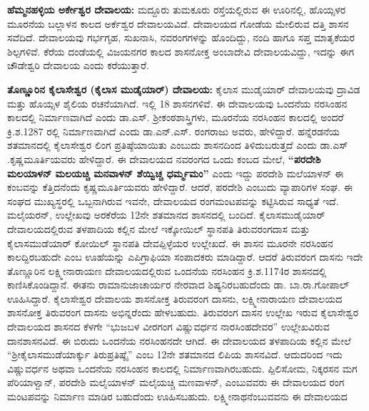 \textbf{ಹೆಮ್ಮನಹಳ್ಳಿಯ ಅರ್ಕೇಶ್ವರ ದೇವಾಲಯ:} ಮದ್ದೂರು ತುಮಕೂರು ರಸ್ತೆಯಲ್ಲಿರುವ ಈ ಊರಿನಲ್ಲಿ, ಹೊಯ್ಸಳರ ಮೂರನೆಯ ಬಲ್ಲಾಳನ ಕಾಲದ ಅರ್ಕೆಶ್ವರ ದೇವಾಲಯವಿದೆ. ದೇವಾಲಯದ ಗೋಡೆಯ ಮೇಲಿರುವ ದತ್ತಿ ಶಾಸನ ಸವೆದಿದೆ. ದೇವಾಲಯವು ಗರ್ಭಗೃಹ, ಸುಖನಾಸಿ, ನವರಂಗಗಳನ್ನು ಹೊಂದಿದ್ದು, ನಂದಿ ಹಾಗೂ ಸಪ್ತ ಮಾತೃಕೆಯರ ಶಿಲ್ಪಗಳಿವೆ. ಕೆರೆಯ ದಂಡೆಯಲ್ಲಿ ವಿಜಯನಗರ ಕಾಲದ ಶಾಸನೋಕ್ತ ಅಂಬಾದೇವಿ ದೇವಾಲಯವಿದ್ದು, ಇದನ್ನು ಈಗ ಚೌಡೇಶ್ವರಿ ದೇವಾಲಯ ಎಂದು ಕರೆಯುತ್ತಾರೆ.

\textbf{ತೊಣ್ಣೂರಿನ ಕೈಲಾಸೇಶ್ವರ (ಕೈಲಾಸ ಮುಡೈಯಾರ್​) ದೇವಾಲಯ:} ಕೈಲಾಸ ಮುಡೈಯಾರ್​ ದೇವಾಲಯವು ದ್ರಾವಿಡ ಮತ್ತು ಹೊಯ್ಸಳ ಶೈಲಿಯ ರಚನೆಯಾಗಿದೆ. ಇಲ್ಲಿ 18 ಶಾಸನಗಳಿವೆ. ಈ ದೇವಾಲಯವು ಒಂದನೆಯ ನರಸಿಂಹನ ಕಾಲದಲ್ಲಿ ನಿರ್ಮಾಣವಾಗಿದೆ ಎಂದು ಡಾ.ಎಸ್​. ಶ‍್ರೀಕಂಠಶಾಸ್ತ್ರಿಗಳು, ಮೂರನೆಯ ನರಸಿಂಹನ ಕಾಲದಲ್ಲಿ ಅಂದರೆ ಕ್ರಿ.ಶ.1287 ರಲ್ಲಿ ನಿರ್ಮಾಣವಾಗಿದೆ ಎಂದು ಡಾ.ಎನ್​.ಎಸ್​. ರಂಗರಾಜು ಅವರು, ಹೇಳಿದ್ದಾರೆ. ಹನ್ನೆರಡನೆಯ ಶತಮಾನದಲ್ಲಿ ಕೈಲಾಸೇಶ್ವರ ಲಿಂಗ ಪ್ರತಿಷ್ಠೆಯಾಯಿತು ಎಂಬುದು ಶಾಸನದಿಂದ ತಿಳಿದುಬರುತ್ತದೆ ಎಂದು ಡಾ.ಎಸ್​.ಕೃಷ್ಣಮೂರ್ತಿಯವರು ಹೇಳಿದ್ದಾರೆ. ಈ ದೇವಾಲಯದ ನವರಂಗದ ಒಂದು ಕಂಬದ ಮೇಲೆ, \textbf{“ಪರದೇಶಿ ಮಲಯಾಳನ್​ ಮಲಯಚ್ಚಿ ಮನವಾಳನ್​ ಶೆಯ್ವಿಚ್ಚ ಧರ್ಮ್ಮಮಂ”} ಎಂದು ಇದ್ದು ಪರದೇಶಿ ಮಲೆಯಾಳನ್​ ಈ ಕಂಬವನ್ನು ಕೆತ್ತಿದನೆಂದು ಕೃಷ್ಣಮೂರ್ತಿಯವರು ಹೇಳಿದ್ದಾರೆ. ಆದರೆ, ಪರದೇಶಿ ಎಂಬುದು ವ್ಯಾಪಾರಿಗಳ ಸಂಘ. ಈ ಸಂಘದ ಮುಖ್ಯಸ್ಥರಲ್ಲಿ ಒಬ್ಬನಾಗಿರುವ ಇವನೇ, ದೇವಾಲಯದ ರಂಗಮಂಟಪವನ್ನು ಕಟ್ಟಿಸಿರುವ ಸಾಧ್ಯತೆ ಇದೆ. ಮಲೈಯರನ್​, ಉಲ್ಲೇಖವು ಅರಕೆರೆಯ 12ನೇ ಶತಮಾನದ ಶಾಸನದಲ್ಲಿ ಬಂದಿದೆ. ಕೈಲಾಸಮುಡೈಯಾರ್​ ದೇವಾಲಯದಲ್ಲಿರುವ ತಳಪಾದಿಯ ಕಲ್ಲಿನ ಮೇಲೆ ಇಕ್ಕೋಯಿಲ್​ ಸ್ಥಾನಪತಿ ತಿರುವರಂಗದಾಸ ಮತ್ತು ಕೈಲಾಸಮುಡೆಯಾರ್​ ಕೋಯಿಲ್​ ಸ್ಥಾನಪತಿ ದೇವಪ್ಪಿಳ್ಳೆಯರ ಉಲ್ಲೇಖದೆ. ಈ ಶಾಸನ ಮೂರನೇ ನರಸಿಂಹನ ಕಾಲದ್ದಿರಬಹುದೇ ಎಂಬ ಊಹೆಯನ್ನು ಎಪಿಗ್ರಾಫಿಯಾ ಸಂಪಾದಕರು ಮಾಡಿದ್ದಾರೆ. ಆದರೆ ತಿರುವರಂಗ ದಾಸನು ಇದೇ ತೊಣ್ಣೂರಿನ ಲಕ್ಷ್ಮೀನಾರಾಯಣ ದೇವಾಲಯದಲ್ಲಿರುವ ಒಂದನೆಯ ನರಸಿಂಹನ ಕ್ರಿ.ಶ.1174ರ ಶಾಸನದಲ್ಲಿ ಕಾಣಿಸಿಕೊಂಡಿದ್ದಾನೆ. ಈತನು ರಾಮಾನುಜಾಚಾರ್ಯರ ನೇರವಾದ ಶಿಷ್ಯನಿರಬಹು\-ದೆಂದು ಡಾ. ಬಾ.ರಾ.ಗೋಪಾಲ್​ ಊಹಿಸಿದ್ದಾರೆ. ಕೈಲಾಸೇಶ್ವರ ದೇವಾಲಯ ಶಾಸನೋಕ್ತ ತಿರುವರಂಗ ದಾಸನು, ಲಕ್ಷ್ಮೀನಾರಾಯಣ ದೇವಾಲಯದ ಶಾಸನೋಕ್ತ ತಿರುವರಂಗ ದಾಸನು ಅಭಿನ್ನರೆಂದು ಹೇಳಬಹುದು. ತಿರುವರಂಗ ದಾಸನ ಉಲ್ಲೇಖ ಇರುವ ಕೈಲಾಸೇಶ್ವರ ದೇವಾಲಯದ ಶಾಸನದ ಕೆಳಗೇ “ಭುಜಬಳ ವೀರಗಂಗ ವಿಷ್ಣುವರ್ಧನ ನಾರಸಿಂಹದೇವರ” ಉಲ್ಲೇಖವಿರುವ ದಾನಶಾಸನವಿದೆ. ಈ ಬಿರುದು ಒಂದನೆಯ ನರಸಿಂಹನದೇ ಆಗಿದೆ. ಈ ದೇವಾಲಯದ ತಳಪಾದಿಯ ಕಲ್ಲಿನ ಮೇಲೆ “ಶ‍್ರೀಕೈಲಾಸಮುಡೆಯಾರ್ಕ್ಕು ತಿರುಪ್ರತಿಷ್ಠೈ” ಎಂಬ 12ನೇ ಶತಮಾನದ ಲಿಪಿಯ ಶಾಸನವಿದೆ. ಆದುದರಿಂದ ಇದು ವಿಷ್ಣುವರ್ಧನ ಅಥವಾ ಒಂದನೆಯ ನರಸಿಂಹನ ಕಾಲದಲ್ಲಿ ನಿರ್ಮಾಣವಾಗಿರಬಹುದು. ಪ್ಪಿಲಿಸೋಮ, ನಿಕ್ಕರಸನ ಮಗ ಪೆರಿಯಾಳ್ವಾನ್,​ ಪರದೇಶಿ ಮಲೈಯಾಳನ್​ ಮಲೈಯಚ್ಚಿ ಮಣವಾಳನ್​, ಎಂಬುವವರು ಈ ದೇವಾಲಯದ ರಂಗ ಮಂಟಪವನ್ನು ನಿರ್ಮಾಣ ಮಾಡಿರ ಬಹುದೆಂದು ಊಹಿಸಬಹುದು. ಲಕ್ಷ್ಮೀನಾಥನೆಂಬುವವನು ಈ ದೇವಾಲಯದ 